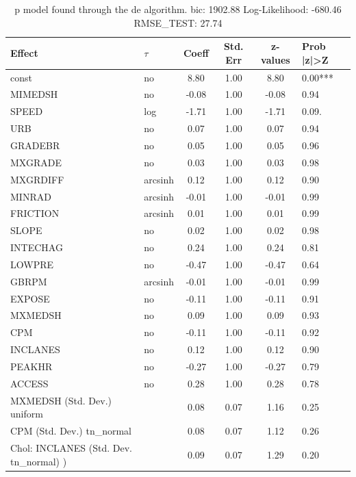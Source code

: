 \begin{table}
	\caption{p model found through the de algorithm. bic: 1902.88 Log-Likelihood: -680.46 RMSE_TEST: 27.74}
	\begin{center}
		\begin{tabular}{|l|l|c|c|c|l|}
			\hline
			Effect & $\tau$ & Coeff & Std. Err & z-values & Prob |z|>Z \\
			\hline
			const & no & 8.80 & 1.00 & 8.80 & 0.00*** \\
			\hline
			MIMEDSH & no & -0.08 & 1.00 & -0.08 & 0.94 \\
			\hline
			SPEED & log & -1.71 & 1.00 & -1.71 & 0.09. \\
			\hline
			URB & no & 0.07 & 1.00 & 0.07 & 0.94 \\
			\hline
			GRADEBR & no & 0.05 & 1.00 & 0.05 & 0.96 \\
			\hline
			MXGRADE & no & 0.03 & 1.00 & 0.03 & 0.98 \\
			\hline
			MXGRDIFF & arcsinh & 0.12 & 1.00 & 0.12 & 0.90 \\
			\hline
			MINRAD & arcsinh & -0.01 & 1.00 & -0.01 & 0.99 \\
			\hline
			FRICTION & arcsinh & 0.01 & 1.00 & 0.01 & 0.99 \\
			\hline
			SLOPE & no & 0.02 & 1.00 & 0.02 & 0.98 \\
			\hline
			INTECHAG & no & 0.24 & 1.00 & 0.24 & 0.81 \\
			\hline
			LOWPRE & no & -0.47 & 1.00 & -0.47 & 0.64 \\
			\hline
			GBRPM & arcsinh & -0.01 & 1.00 & -0.01 & 0.99 \\
			\hline
			EXPOSE & no & -0.11 & 1.00 & -0.11 & 0.91 \\
			\hline
			MXMEDSH & no & 0.09 & 1.00 & 0.09 & 0.93 \\
			\hline
			CPM & no & -0.11 & 1.00 & -0.11 & 0.92 \\
			\hline
			INCLANES & no & 0.12 & 1.00 & 0.12 & 0.90 \\
			\hline
			PEAKHR & no & -0.27 & 1.00 & -0.27 & 0.79 \\
			\hline
			ACCESS & no & 0.28 & 1.00 & 0.28 & 0.78 \\
			\hline
			MXMEDSH (Std. Dev.) uniform &  & 0.08 & 0.07 & 1.16 & 0.25 \\
			\hline
			CPM (Std. Dev.) tn_normal &  & 0.08 & 0.07 & 1.12 & 0.26 \\
			\hline
			 Chol: INCLANES (Std. Dev. tn_normal) ) &  & 0.09 & 0.07 & 1.29 & 0.20 \\

\end{tabular}
\end{center}
\end{table}
